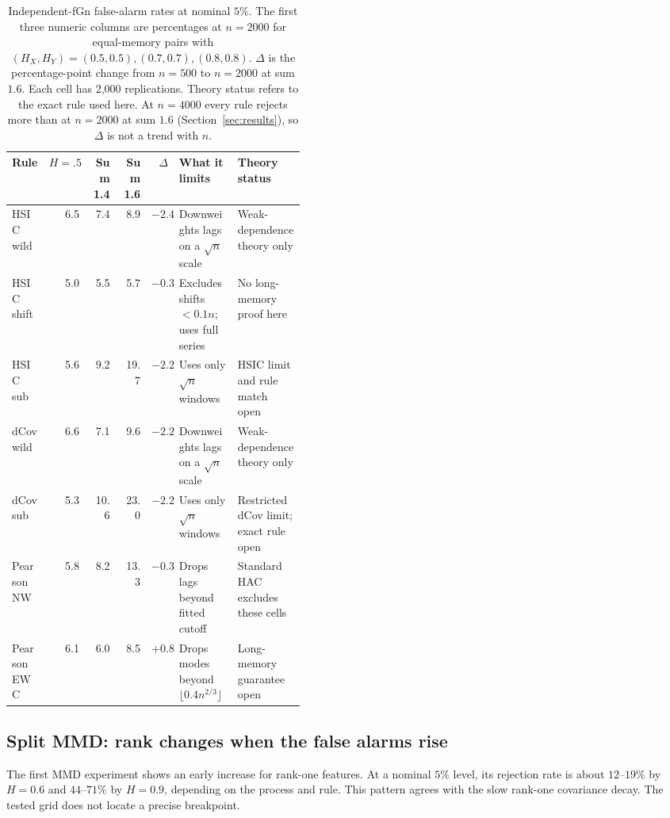 \documentclass[11pt]{article}
\theoremstyle{remark}
\begin{document}
\begin{table}[H]
\centering\footnotesize
\setlength{\tabcolsep}{4pt}
\caption{Independent-fGn false-alarm rates at nominal $5\%$. The first three numeric columns are percentages at $n=2000$ for equal-memory pairs with $(H_X,H_Y)=(0.5,0.5),(0.7,0.7),(0.8,0.8)$. $\Delta$ is the percentage-point change from $n=500$ to $n=2000$ at sum $1.6$. Each cell has 2,000 replications. Theory status refers to the exact rule used here. At $n=4000$ every rule rejects more than at $n=2000$ at sum $1.6$ (Section~\ref{sec:results}), so $\Delta$ is not a trend with $n$.}\label{tab:rules}
\begin{tabular}{@{}lrrrr>{\raggedright\arraybackslash}p{0.20\linewidth}>{\raggedright\arraybackslash}p{0.23\linewidth}@{}}
\toprule
Rule & $H=.5$ & Sum 1.4 & Sum 1.6 & $\Delta$ & What it limits & Theory status \\
\midrule
HSIC wild & 6.5 & 7.4 & 8.9 & $-2.4$ & Downweights lags on a $\sqrt n$ scale & Weak-dependence theory only \\
HSIC shift & 5.0 & 5.5 & 5.7 & $-0.3$ & Excludes shifts $<0.1n$; uses full series & No long-memory proof here \\
HSIC sub & 5.6 & 9.2 & 19.7 & $-2.2$ & Uses only $\sqrt n$ windows & HSIC limit and rule match open \\
dCov wild & 6.6 & 7.1 & 9.6 & $-2.2$ & Downweights lags on a $\sqrt n$ scale & Weak-dependence theory only \\
dCov sub & 5.3 & 10.6 & 23.0 & $-2.2$ & Uses only $\sqrt n$ windows & Restricted dCov limit; exact rule open \\
Pearson NW & 5.8 & 8.2 & 13.3 & $-0.3$ & Drops lags beyond fitted cutoff & Standard HAC excludes these cells \\
Pearson EWC & 6.1 & 6.0 & 8.5 & $+0.8$ & Drops modes beyond $\lfloor0.4n^{2/3}\rfloor$ & Long-memory guarantee open \\
\bottomrule
\end{tabular}
\end{table}

\subsection{Split MMD: rank changes when the false alarms rise}
The first MMD experiment shows an early increase for rank-one features. At a nominal $5\%$ level, its rejection rate is about $12$--$19\%$ by $H=0.6$ and $44$--$71\%$ by $H=0.9$, depending on the process and rule. This pattern agrees with the slow rank-one covariance decay. The tested grid does not locate a precise breakpoint.
\end{document}
